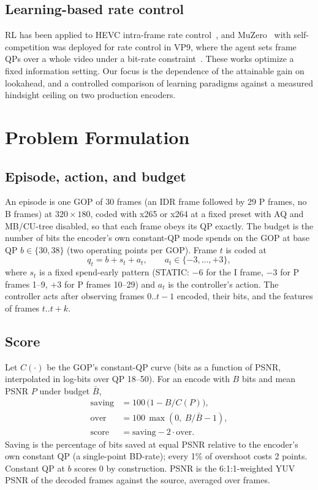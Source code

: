 \documentclass[conference]{IEEEtran}
\begin{document}
\subsection{Learning-based rate control}
RL has been applied to HEVC intra-frame rate control~\cite{hu2018rlintra}, and MuZero~\cite{schrittwieser2020muzero} with self-competition was deployed for rate control in VP9, where the agent sets frame QPs over a whole video under a bit-rate constraint~\cite{mandhane2022muzero}. These works optimize a fixed information setting. Our focus is the dependence of the attainable gain on lookahead, and a controlled comparison of learning paradigms against a measured hindsight ceiling on two production encoders.

\section{Problem Formulation}\label{sec:problem}
\subsection{Episode, action, and budget}
An episode is one GOP of 30 frames (an IDR frame followed by 29 P frames, no B frames) at $320{\times}180$, coded with x265 or x264 at a fixed preset with AQ and MB/CU-tree disabled, so that each frame obeys its QP exactly. The budget is the number of bits the encoder's own constant-QP mode spends on the GOP at base QP $b \in \{30, 38\}$ (two operating points per GOP). Frame $t$ is coded at
\begin{equation}
q_t = b + s_t + a_t,\qquad a_t \in \{-3,\dots,+3\},
\end{equation}
where $s_t$ is a fixed spend-early pattern (STATIC: $-6$ for the I frame, $-3$ for P frames 1--9, $+3$ for P frames 10--29) and $a_t$ is the controller's action. The controller acts after observing frames $0..t{-}1$ encoded, their bits, and the features of frames $t..t{+}k$.

\subsection{Score}
Let $C(\cdot)$ be the GOP's constant-QP curve (bits as a function of PSNR, interpolated in log-bits over QP 18--50). For an encode with $B$ bits and mean PSNR $P$ under budget $\bar B$,
\begin{align}
\text{saving} &= 100\,\big(1 - B / C(P)\big),\\
\text{over} &= 100\,\max(0,\ B/\bar B - 1),\\
\text{score} &= \text{saving} - 2\cdot\text{over}.
\end{align}
Saving is the percentage of bits saved at equal PSNR relative to the encoder's own constant QP (a single-point BD-rate); every 1\% of overshoot costs 2 points. Constant QP at $b$ scores 0 by construction. PSNR is the 6:1:1-weighted YUV PSNR of the decoded frames against the source, averaged over frames.
\end{document}
